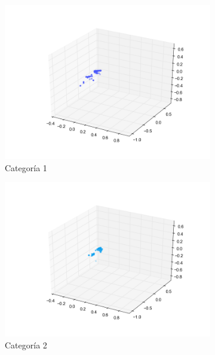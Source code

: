\begin{figure}[H]
        \begin{subfigure}[b]{0.33\textwidth}
                \includegraphics[width=\linewidth]{secciones/graficos/sanger/categoria_1.png}
                \caption{Categoría 1}
                \label{fig: ej1_sanger_categoria_1}
        \end{subfigure}
        \begin{subfigure}[b]{0.33\textwidth}
                \includegraphics[width=\linewidth]{secciones/graficos/sanger/categoria_2.png}
                \caption{Categoría 2}
                \label{fig: ej1_sanger_categoria_2}
        \end{subfigure}
        \begin{subfigure}[b]{0.33\textwidth}

\end{subfigure}
\end{figure}
